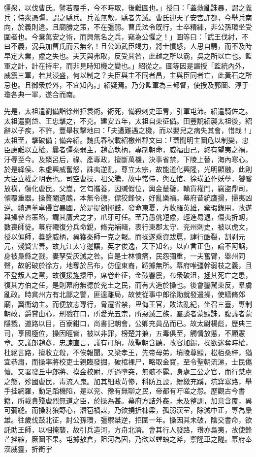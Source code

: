 \begin{pinyinscope}
彊衆，以伐曹氏。譬若覆手，今不時取，後難圖也。」授曰：「蓋救亂誅暴，謂之義兵；恃衆憑彊，謂之驕兵。兵義無敵，驕者先滅。曹氏迎天子安宮許都，今舉兵南向，於義則違。且廟勝之策，不在彊弱。曹氏法令旣行，士卒精練，非公孫瓚坐受圍者也。今棄萬安之術，而興無名之兵，竊為公懼之！」圖等曰：「武王伐紂，不曰不義，況兵加曹氏而云無名！且公師武臣竭力，將士憤怒，人思自騁，而不及時早定大業，慮之失也。夫天與弗取，反受其咎，此越之所以霸，吳之所以亡也。監軍之計，計在持牢，而非見時知機之變也。」紹從之。圖等因是譖授「監統內外，威震三軍，若其浸盛，何以制之？夫臣與主不同者昌，主與臣同者亡，此黃石之所忌也。且御衆於外，不宜知內。」紹疑焉。乃分監軍為三都督，使授及郭圖、淳于瓊各典一軍，遂合而南。

先是，太祖遣劉備詣徐州拒袁術。術死，備殺刺史車冑，引軍屯沛。紹遣騎佐之。太祖遣劉岱、王忠擊之，不克。建安五年，太祖自東征備。田豐說紹襲太祖後，紹辭以子疾，不許，豐舉杖擊地曰：「夫遭難遇之機，而以嬰兒之病失其會，惜哉！」太祖至，擊破備；備奔紹。魏氏春秋載紹檄州郡文曰：「蓋聞明主圖危以制變，忠臣慮難以立權。曩者彊秦弱主，趙高執柄，專制朝命，威福由己，終有望夷之禍，汙辱至今。及臻呂后，祿、產專政，擅斷萬機，決事省禁，下陵上替，海內寒心。於是絳侯、朱虛興威奮怒，誅夷逆亂，尊立太宗，故能道化興隆，光明顯融，此則大臣立權之明表也。司空曹操，祖父騰，故中常侍，與左悺、徐璜並作妖孽，饕餮放橫，傷化虐民。父嵩，乞匄攜養，因贓假位，輿金輦璧，輸貨權門，竊盜鼎司，傾覆重器。操贅閹遺醜，本無令德，僄狡鋒俠，好亂樂禍。幕府昔統鷹揚，掃夷凶逆。續遇董卓侵官暴國，於是提劒揮鼓，發命東夏，方收羅英雄，棄瑕錄用，故遂與操參咨策略，謂其鷹犬之才，爪牙可任。至乃愚佻短慮，輕進易退，傷夷折衂，數喪師徒。幕府輙復分兵命銳，脩完補輯，表行東郡太守、兖州刺史，被以虎文，授以偏師，獎蹙威柄，兾獲秦師一克之報。而操遂乘資跋扈，肆行酷裂，割剥元元，殘賢害善。故九江太守邊讓，英才俊逸，天下知名，以直言正色，論不阿諂，身被梟縣之戮，妻孥受灰滅之咎。自是士林憤痛，民怨彌重，一夫奮臂，舉州同聲，故躬破於徐方，地奪於呂布，仿偟東裔，蹈據無所。幕府唯彊幹弱枝之義，且不登叛人之黨，故復援旌擐甲，席卷赴征，金鼓響震，布衆破沮，拯其死亡之患，復其方伯之任，是則幕府無德於兖土之民，而有大造於操也。後會鑾駕東反，羣虜亂政。時兾州方有北鄙之警，匪遑離局，故使從事中郎徐勛就發遣操，使繕脩郊廟，翼衞幼主。而便放志專行，脅遷省禁，卑侮王官，敗法亂紀，坐召三臺，專制朝政，爵賞由心，刑戮在口，所愛光五宗，所惡滅三族，羣談者蒙顯誅，腹議者蒙隱戮，道路以目，百寮鉗口，尚書記朝會，公卿充員品而已。故太尉楊彪，歷典三司，享國極位，操因睚眥，被以非罪，榜楚并兼，五毒俱至，觸情放慝，不顧憲章。又議郎趙彥，忠諫直言，議有可納，故聖朝含聽，改容加錫，操欲迷奪時權，杜絕言路，擅收立殺，不俟報聞。又梁孝王，先帝母弟，墳陵尊顯，松栢桑梓，猶宜恭肅，而操率將校吏士親臨發掘，破棺裸尸，略取金寶，至令聖朝流涕，士民傷懷。又署發丘中郎將、摸金校尉，所過墮突，無骸不露。身處三公之官，而行桀虜之態，殄國虐民，毒流人鬼。加其細政苛慘，科防互設，繒繳充蹊，坑穽塞路，舉手挂網羅，動足蹈機陷，是以兖、豫有無聊之民，帝都有吁嗟之怨。歷觀古今書籍，所載貪殘虐烈無道之臣，於操為甚。幕府方詰外姦，未及整訓，加意含覆，兾可彌縫。而操豺狼野心，潛苞禍謀，乃欲撓折棟梁，孤弱漢室，除滅中正，專為梟雄。往歲伐鼓北征，討公孫瓚，彊禦桀逆，拒圍一年。操因其未破，陰交書命，欲託助王師，以相掩襲，故引兵造河，方舟北濟。會其行人發路，瓚亦梟夷，故使鋒芒挫縮，厥圖不果。屯據敖倉，阻河為固，乃欲以螳蜋之斧，禦隆車之隧。幕府奉漢威靈，折衝宇
\end{pinyinscope}
